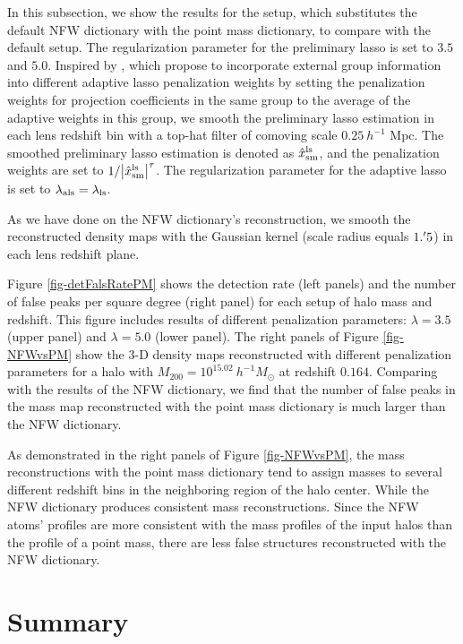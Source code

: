 \documentclass[twocolumn]{aastex62}
\begin{document}
In this subsection, we show the results for the setup, which substitutes the
default NFW dictionary with the point mass dictionary, to compare with the
default setup.  The regularization parameter for the preliminary lasso is set
to $3.5$ and $5.0$.  Inspired by \citet{structureAdaLasso-Pramanik2020}, which
propose to incorporate external group information into different adaptive lasso
penalization weights by setting the penalization weights for projection
coefficients in the same group to the average of the adaptive weights in this
group, we smooth the preliminary lasso estimation in each lens redshift bin
with a top-hat filter of comoving scale $0.25~h^{-1}$ Mpc. The smoothed
preliminary lasso estimation is denoted as $\hat{x}^{\rm{ls}}_{\rm{sm}}$, and
the penalization weights are set to $1/\abs{\hat{x}^{\rm{ls}}_{\rm{sm}}}^\tau$.
The regularization parameter for the adaptive lasso is set to
$\lambda_{\rm{als}}=\lambda_{\rm{ls}}$.

As we have done on the NFW dictionary's reconstruction, we smooth the
reconstructed density maps with the Gaussian kernel (scale radius equals
$1.\mbox{$^\prime$} 5$) in each lens redshift plane.

Figure \ref{fig-detFalsRatePM} shows the detection rate (left panels) and the
number of false peaks per square degree (right panel) for each setup of halo
mass and redshift.
This figure includes results of different penalization parameters:
$\lambda=3.5$ (upper panel) and $\lambda=5.0$ (lower panel). The right panels
of Figure \ref{fig-NFWvsPM} show the $3$-D density maps reconstructed with
different penalization parameters for a halo with $M_{200}=10^{15.02}
~h^{-1}M_{\odot}$ at redshift $0.164$.
Comparing with the results of the NFW dictionary, we find that the number of
false peaks in the mass map reconstructed with the point mass dictionary is
much larger than the NFW dictionary.

As demonstrated in the right panels of Figure \ref{fig-NFWvsPM}, the mass
reconstructions with the point mass dictionary tend to assign masses to
several different redshift bins in the neighboring region of the halo center.
While the NFW dictionary produces consistent mass reconstructions.
Since the NFW atoms' profiles are more consistent with the mass profiles of the
input halos than the profile of a point mass, there are less false structures
reconstructed with the NFW dictionary.

\section{Summary}
\label{sec:Sum}
\end{document}
